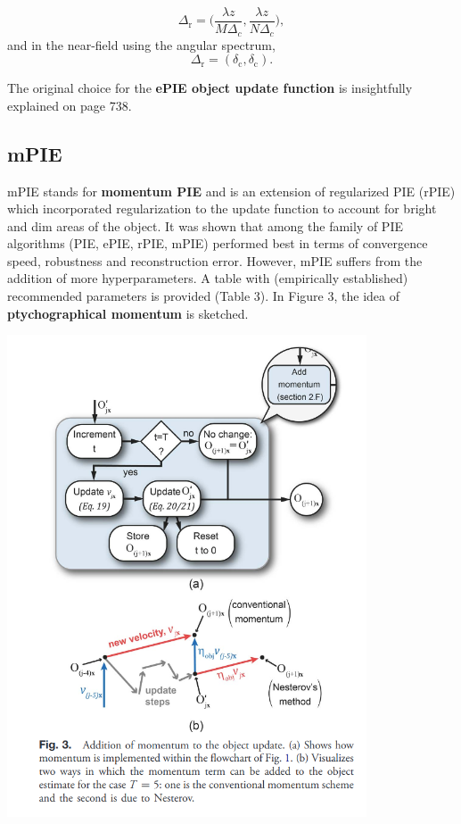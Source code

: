 \documentclass{article}
\begin{document}
\begin{equation}
    \Delta_\mathrm{r} = \Big(\frac{\lambda z}{M\Delta_{c}}, \frac{\lambda z}{N\Delta_{c}}\Big),
\end{equation}
and in the near-field using the angular spectrum,
\begin{equation}
    \Delta_\mathrm{r} = (\delta_\mathrm{c}, \delta_\mathrm{c}).
\end{equation}

The original choice for the \textbf{ePIE object update function} is insightfully explained on page 738.

\subsection{mPIE}

mPIE stands for \textbf{momentum PIE} and is an extension of regularized PIE (rPIE) which incorporated regularization to the update function to account for bright and dim areas of the object. It was shown that among the family of PIE algorithms (PIE, ePIE, rPIE, mPIE) performed best in terms of convergence speed, robustness and reconstruction error. However, mPIE suffers from the addition of more hyperparameters. A table with (empirically established) recommended parameters is provided (Table 3). In Figure 3, the idea of \textbf{ptychographical momentum} is sketched.

\begin{center}
\includegraphics[width=0.8\textwidth]{figures/mPIE_momentum.png}
\end{center}
\end{document}

